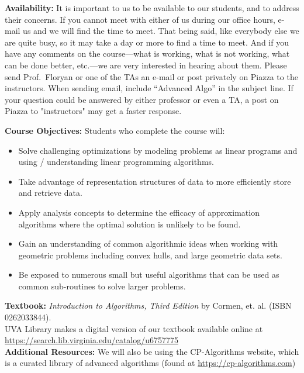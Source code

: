 \documentclass[12pt]{article}
\begin{document}
\textbf{Availability:} It is important to us to be available to our students, and to address their concerns.  If you cannot meet with either of us during our office hours, e-mail us and we will find the time to meet. That being said, like everybody else we are quite busy, so it may take a day or more to find a time to meet. And if you have any comments on the course---what is working, what is not working, what can be done better, etc.---we are very interested in hearing about them.  Please send Prof.\ Floryan or one of the TAs an e-mail or post privately on Piazza to the instructors.  When sending email, include ``Advanced Algo'' in the subject line. If your question could be answered by either professor or even a TA, a post on Piazza to "instructors" may get a faster response.


\textbf{Course Objectives:} Students who complete the course will:
\begin{itemize}
    \item Solve challenging optimizations by modeling problems as linear programs and using / understanding linear programming algorithms. 
    \item Take advantage of representation structures of data to more efficiently store and retrieve data.
    \item Apply analysis concepts to determine the efficacy of approximation algorithms where the optimal solution is unlikely to be found.
    \item Gain an understanding of common algorithmic ideas when working with geometric problems including convex hulls, and large geometric data sets.
    \item Be exposed to numerous small but useful algorithms that can be used as common sub-routines to solve larger problems.
\end{itemize}

\textbf{Textbook:} \textit{Introduction to Algorithms, Third Edition} by Cormen, et. al. (ISBN 0262033844).\\
UVA Library makes a digital version of our textbook available online at\\\url{https://search.lib.virginia.edu/catalog/u6757775}\\

\textbf{Additional Resources:} We will also be using the CP-Algorithms website, which is a curated library of advanced algorithms (found at \url{https://cp-algorithms.com})
\end{document}
